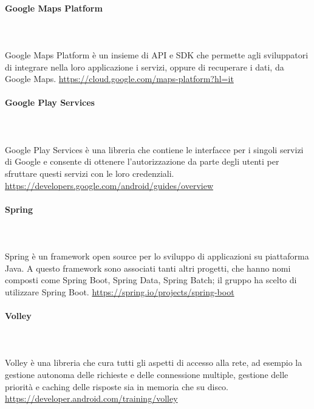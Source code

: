 \paragraph{Google Maps Platform}\mbox{}\\ \\
Google Maps Platform è un insieme di API e SDK che permette agli sviluppatori di integrare nella loro applicazione i servizi, oppure di recuperare i dati, da Google Maps.
\href{https://cloud.google.com/maps-platform?hl=it}{https://cloud.google.com/maps-platform?hl=it}

\paragraph{Google Play Services}\mbox{}\\ \\
Google Play Services è una libreria che contiene le interfacce per i singoli servizi di Google e consente di ottenere l'autorizzazione da parte degli utenti per sfruttare questi servizi con le loro credenziali.
\href{https://developers.google.com/android/guides/overview}{https://developers.google.com/android/guides/overview}

\paragraph{Spring}\mbox{}\\ \\
Spring è un framework open source per lo sviluppo di applicazioni su piattaforma Java.
A questo framework sono associati tanti altri progetti, che hanno nomi composti come Spring Boot, Spring Data, Spring Batch; il gruppo ha scelto di utilizzare Spring Boot.
\href{https://spring.io/projects/spring-boot}{https://spring.io/projects/spring-boot}


\paragraph{Volley}\mbox{}\\ \\
Volley è una libreria che cura tutti gli aspetti di accesso alla rete, ad esempio la gestione autonoma delle richieste e delle connessione multiple, gestione delle priorità e caching delle risposte sia in memoria che su disco.
\href{https://developer.android.com/training/volley}{https://developer.android.com/training/volley}